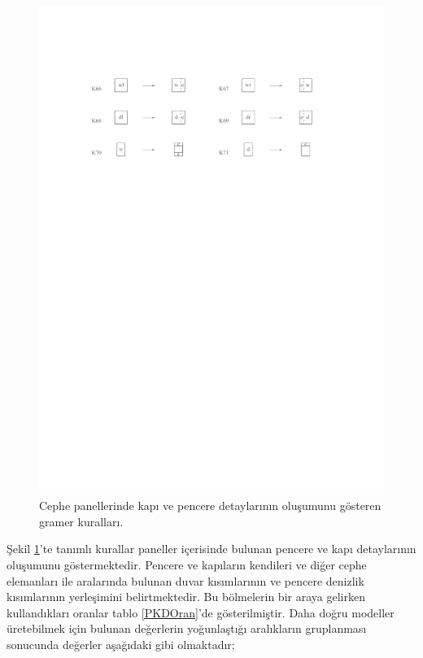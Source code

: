 \documentclass[12pt,turkish,a4paperpaper,]{report}
\begin{document}
\begin{figure}
\centering
\includegraphics[width=1\textwidth,height=\textheight]{source/figures/KPaneller3.pdf}
\caption{Cephe panellerinde kapı ve pencere detaylarının oluşumunu
gösteren gramer kuralları. \label{KPaneller3}}
\end{figure}

Şekil \ref{KPaneller3}'te tanımlı kurallar paneller içerisinde bulunan
pencere ve kapı detaylarının oluşumunu göstermektedir. Pencere ve
kapıların kendileri ve diğer cephe elemanları ile aralarında bulunan
duvar kısımlarının ve pencere denizlik kısımlarının yerleşimini
belirtmektedir. Bu bölmelerin bir araya gelirken kullandıkları oranlar
tablo \ref{PKDOran}'de gösterilmiştir. Daha doğru modeller üretebilmek
için bulunan değerlerin yoğunlaştığı aralıkların gruplanması sonucunda
değerler aşağıdaki gibi olmaktadır;
\end{document}
